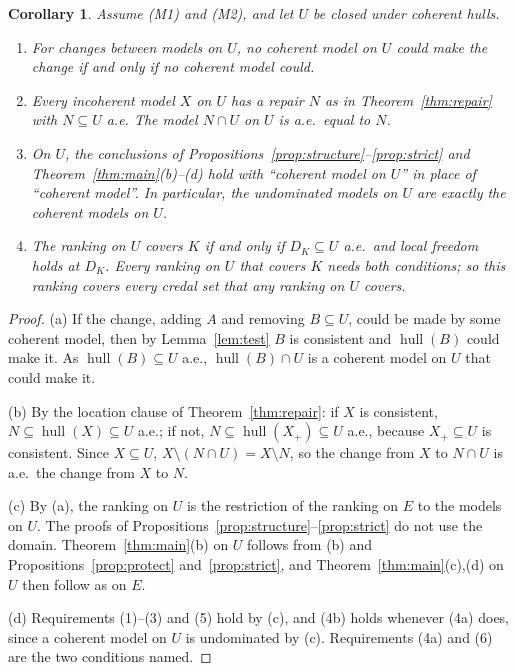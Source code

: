 \documentclass[11pt]{article}
\newcommand{\hull}{\operatorname{hull}}
\theoremstyle{plain}
\newtheorem{corollary}[theorem]{Corollary}
\theoremstyle{definition}
\theoremstyle{remark}
\begin{document}
\begin{corollary}\label{cor:domains}
Assume (M1) and (M2), and let $U$ be closed under coherent hulls.
\begin{enumerate}[label=(\alph*)]
  \item For changes between models on $U$, no coherent model on $U$ could make the change if and
  only if no coherent model could.
  \item Every incoherent model $X$ on $U$ has a repair $N$ as in Theorem~\ref{thm:repair} with
  $N\subseteq U$ a.e. The model $N\cap U$ on $U$ is a.e.\ equal to $N$.
  \item On $U$, the conclusions of Propositions~\ref{prop:structure}--\ref{prop:strict} and
  Theorem~\ref{thm:main}(b)--(d) hold with ``coherent model on $U$'' in place of ``coherent
  model''. In particular, the undominated models on $U$ are exactly the coherent models on $U$.
  \item The ranking on $U$ covers $K$ if and only if $D_K\subseteq U$ a.e.\ and local freedom
  holds at $D_K$. Every ranking on $U$ that covers $K$ needs both conditions; so this ranking
  covers every credal set that any ranking on $U$ covers.
\end{enumerate}
\end{corollary}

\begin{proof}
(a) If the change, adding $A$ and removing $B\subseteq U$, could be made by some coherent model,
then by Lemma~\ref{lem:test} $B$ is consistent and $\hull(B)$ could make it. As $\hull(B)
\subseteq U$ a.e., $\hull(B)\cap U$ is a coherent model on $U$ that could make it.

(b) By the location clause of Theorem~\ref{thm:repair}: if $X$ is consistent, $N\subseteq
\hull(X)\subseteq U$ a.e.; if not, $N\subseteq\hull(X_+)\subseteq U$ a.e., because $X_+
\subseteq U$ is consistent. Since $X\subseteq U$, $X\setminus(N\cap U)=X\setminus N$, so the
change from $X$ to $N\cap U$ is a.e.\ the change from $X$ to $N$.

(c) By (a), the ranking on $U$ is the restriction of the ranking on $E$ to the models on $U$.
The proofs of Propositions~\ref{prop:structure}--\ref{prop:strict} do not use the domain.
Theorem~\ref{thm:main}(b) on $U$ follows from (b) and Propositions~\ref{prop:protect}
and~\ref{prop:strict}, and Theorem~\ref{thm:main}(c),(d) on $U$ then follow as on $E$.

(d) Requirements (1)--(3) and (5) hold by (c), and (4b) holds whenever (4a) does, since a
coherent model on $U$ is undominated by (c). Requirements (4a) and (6) are the two conditions
named.
\end{proof}
\end{document}
